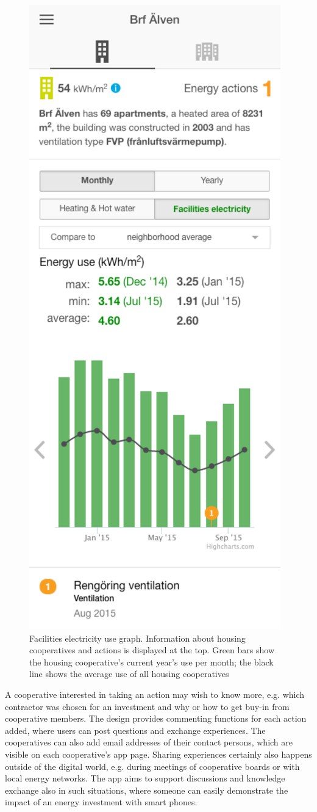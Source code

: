 \begin{figure}[t]
	\sidecaption[t]
\includegraphics[width=.35\linewidth]{img/brf.pdf}
\caption{Facilities electricity use graph. Information about housing cooperatives and actions is displayed at the top. Green bars show the housing cooperative's current year's use per month; the black line shows the average use of all housing cooperatives}
\label{fig:Figure204_Neighbourhood_average} 
\end{figure}



A cooperative interested in taking an action may wish to know more, e.g. which contractor was chosen for an investment and why or how to get buy-in from cooperative members. The design provides commenting functions for each action added, where users can post questions and exchange experiences. The cooperatives can also add email addresses of their contact persons, which are visible on each cooperative's app page.
% 
Sharing experiences certainly also happens outside of the digital world, e.g. during meetings of cooperative boards or with local energy networks. The app aims  to support discussions and knowledge exchange also in such situations, where someone can easily demonstrate the impact of an energy investment with smart phones.

